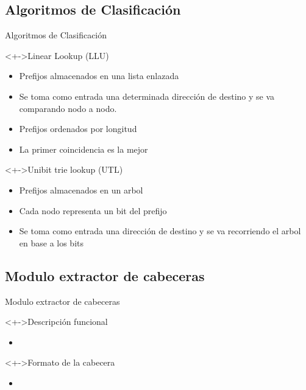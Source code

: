 \documentclass[xcolor=dvipsnames]{beamer}
\begin{document}
\subsection{Algoritmos de Clasificación}
\begin{frame}{Algoritmos de Clasificación}
\begin{block}<+->{Linear Lookup (LLU)}   
    \begin{itemize}
      \scriptsize
     	\item Prefijos almacenados en una lista enlazada
	\item Se toma como entrada una determinada dirección de destino y se va comparando nodo a nodo.
	\item Prefijos ordenados por longitud
	\item La primer coincidencia es la mejor
    \end{itemize}
  \end{block}
  \begin{block}<+->{Unibit trie lookup (UTL)}   
    \begin{itemize}
      \scriptsize
     	\item Prefijos almacenados en un arbol
	\item Cada nodo representa un bit del prefijo
	\item Se toma como entrada una dirección de destino y se va recorriendo el arbol en base a los bits
    \end{itemize}
  \end{block}
\end{frame}

\subsection{Modulo extractor de cabeceras}
\begin{frame}{Modulo extractor de cabeceras}
\begin{block}<+->{Descripción funcional}   
    \begin{itemize}
      \scriptsize
     	\item
    \end{itemize}
  \end{block}
  \begin{block}<+->{Formato de la cabecera}   
    \begin{itemize}
      \scriptsize
     	\item
    \end{itemize}
  \end{block}
\end{frame}
\end{document}

